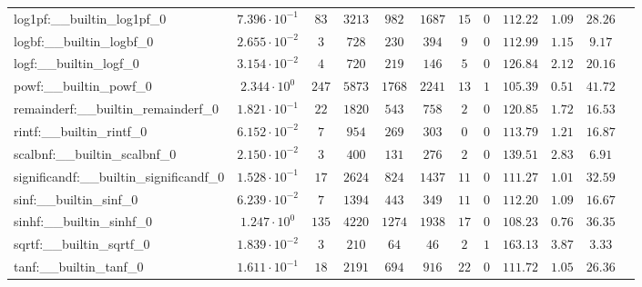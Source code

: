 \begin{tabular}{|l|c|c|c|c|c|c|c|c|c|c|c|}
log1pf:\_\_builtin\_log1pf\_0             & $ 7.396 \cdot 10^{-1} $ & $ 83     $ & $ 3213  $ & $ 982   $ & $ 1687  $ & $ 15  $ & $ 0 $ & $ 112.22      $ & $ 1.09    $ & $ 28.26   $ \\
logbf:\_\_builtin\_logbf\_0               & $ 2.655 \cdot 10^{-2} $ & $ 3      $ & $ 728   $ & $ 230   $ & $ 394   $ & $ 9   $ & $ 0 $ & $ 112.99      $ & $ 1.15    $ & $ 9.17    $ \\
logf:\_\_builtin\_logf\_0                 & $ 3.154 \cdot 10^{-2} $ & $ 4      $ & $ 720   $ & $ 219   $ & $ 146   $ & $ 5   $ & $ 0 $ & $ 126.84      $ & $ 2.12    $ & $ 20.16   $ \\
powf:\_\_builtin\_powf\_0                 & $ 2.344 \cdot 10^{0}  $ & $ 247    $ & $ 5873  $ & $ 1768  $ & $ 2241  $ & $ 13  $ & $ 1 $ & $ 105.39      $ & $ 0.51    $ & $ 41.72   $ \\
remainderf:\_\_builtin\_remainderf\_0     & $ 1.821 \cdot 10^{-1} $ & $ 22     $ & $ 1820  $ & $ 543   $ & $ 758   $ & $ 2   $ & $ 0 $ & $ 120.85      $ & $ 1.72    $ & $ 16.53   $ \\
rintf:\_\_builtin\_rintf\_0               & $ 6.152 \cdot 10^{-2} $ & $ 7      $ & $ 954   $ & $ 269   $ & $ 303   $ & $ 0   $ & $ 0 $ & $ 113.79      $ & $ 1.21    $ & $ 16.87   $ \\
scalbnf:\_\_builtin\_scalbnf\_0           & $ 2.150 \cdot 10^{-2} $ & $ 3      $ & $ 400   $ & $ 131   $ & $ 276   $ & $ 2   $ & $ 0 $ & $ 139.51      $ & $ 2.83    $ & $ 6.91    $ \\
significandf:\_\_builtin\_significandf\_0 & $ 1.528 \cdot 10^{-1} $ & $ 17     $ & $ 2624  $ & $ 824   $ & $ 1437  $ & $ 11  $ & $ 0 $ & $ 111.27      $ & $ 1.01    $ & $ 32.59   $ \\
sinf:\_\_builtin\_sinf\_0                 & $ 6.239 \cdot 10^{-2} $ & $ 7      $ & $ 1394  $ & $ 443   $ & $ 349   $ & $ 11  $ & $ 0 $ & $ 112.20      $ & $ 1.09    $ & $ 16.67   $ \\
sinhf:\_\_builtin\_sinhf\_0               & $ 1.247 \cdot 10^{0}  $ & $ 135    $ & $ 4220  $ & $ 1274  $ & $ 1938  $ & $ 17  $ & $ 0 $ & $ 108.23      $ & $ 0.76    $ & $ 36.35   $ \\
sqrtf:\_\_builtin\_sqrtf\_0               & $ 1.839 \cdot 10^{-2} $ & $ 3      $ & $ 210   $ & $ 64    $ & $ 46    $ & $ 2   $ & $ 1 $ & $ 163.13      $ & $ 3.87    $ & $ 3.33    $ \\
tanf:\_\_builtin\_tanf\_0                 & $ 1.611 \cdot 10^{-1} $ & $ 18     $ & $ 2191  $ & $ 694   $ & $ 916   $ & $ 22  $ & $ 0 $ & $ 111.72      $ & $ 1.05    $ & $ 26.36   $ \\

\end{tabular}
